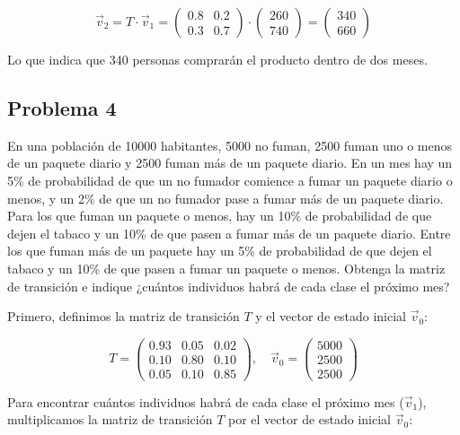 \documentclass{article}
\begin{document}
\[
    \vec{v}_2 = T \cdot \vec{v}_1 = \begin{pmatrix}
        0.8 & 0.2 \\
        0.3 & 0.7
    \end{pmatrix}
    \cdot
    \begin{pmatrix}
        260 \\
        740
    \end{pmatrix}
    =
    \begin{pmatrix}
        340 \\
        660
    \end{pmatrix}
\]

Lo que indica que 340 personas comprarán el producto dentro de dos meses.


\subsection*{Problema 4}

En una población de 10000 habitantes, 5000 no fuman, 2500 fuman uno o menos de un paquete diario y 2500 fuman más de un paquete diario. En un mes hay un 5\% de probabilidad de que un no fumador comience a fumar un paquete diario o menos, y un 2\% de que un no fumador pase a fumar más de un paquete diario. Para los que fuman un paquete o menos, hay un 10\% de probabilidad de que dejen el tabaco y un 10\% de que pasen a fumar más de un paquete diario. Entre los que fuman más de un paquete hay un 5\% de probabilidad de que dejen el tabaco y un 10\% de que pasen a fumar un paquete o menos. Obtenga la matriz de transición e indique ¿cuántos individuos habrá de cada clase el próximo mes?

Primero, definimos la matriz de transición \(T\) y el vector de estado inicial \(\vec{v}_0\):

\[
    T = \begin{pmatrix}
        0.93 & 0.05 & 0.02 \\
        0.10 & 0.80 & 0.10 \\
        0.05 & 0.10 & 0.85
    \end{pmatrix},
    \quad
    \vec{v}_0 = \begin{pmatrix}
        5000 \\
        2500 \\
        2500
    \end{pmatrix}
\]

Para encontrar cuántos individuos habrá de cada clase el próximo mes (\(\vec{v}_1\)), multiplicamos la matriz de transición \(T\) por el vector de estado inicial \(\vec{v}_0\):
\end{document}
